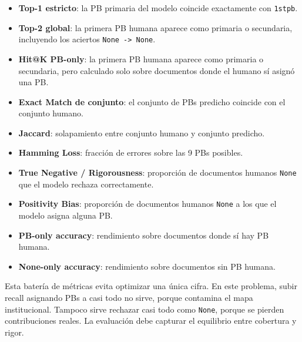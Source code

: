 \begin{itemize}
\item \textbf{Top-1 estricto}: la PB primaria del modelo coincide exactamente con \texttt{1stpb}.
\item \textbf{Top-2 global}: la primera PB humana aparece como primaria o secundaria, incluyendo los aciertos \texttt{None -> None}.
\item \textbf{Hit@K PB-only}: la primera PB humana aparece como primaria o secundaria, pero calculado solo sobre documentos donde el humano sí asignó una PB.
\item \textbf{Exact Match de conjunto}: el conjunto de PBs predicho coincide con el conjunto humano.
\item \textbf{Jaccard}: solapamiento entre conjunto humano y conjunto predicho.
\item \textbf{Hamming Loss}: fracción de errores sobre las 9 PBs posibles.
\item \textbf{True Negative / Rigorousness}: proporción de documentos humanos \texttt{None} que el modelo rechaza correctamente.
\item \textbf{Positivity Bias}: proporción de documentos humanos \texttt{None} a los que el modelo asigna alguna PB.
\item \textbf{PB-only accuracy}: rendimiento sobre documentos donde sí hay PB humana.
\item \textbf{None-only accuracy}: rendimiento sobre documentos sin PB humana.
\end{itemize}

Esta batería de métricas evita optimizar una única cifra. En este problema, subir recall asignando PBs a casi todo no sirve, porque contamina el mapa institucional. Tampoco sirve rechazar casi todo como \texttt{None}, porque se pierden contribuciones reales. La evaluación debe capturar el equilibrio entre cobertura y rigor.

